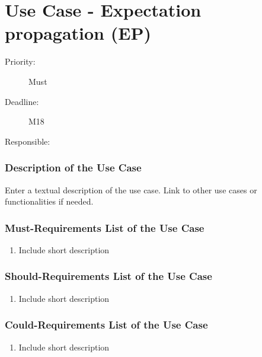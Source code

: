 \newpage
\section{Use Case - Expectation propagation (EP)}
\label{UseCase:EP}

\begin{description}
\item[Priority:] Must
\item[Deadline:] M18
\item[Responsible:]
\end{description}

\subsubsection*{Description of the Use Case}

Enter a textual description of the use case. Link to other use cases or functionalities if needed. 


\subsubsection*{Must-Requirements List of the Use Case}

\begin{enumerate}
\item Include short description
\end{enumerate}

\subsubsection*{Should-Requirements List of the Use Case}

\begin{enumerate}
\item Include short description
\end{enumerate}

\subsubsection*{Could-Requirements List of the Use Case}

\begin{enumerate}
\item Include short description
\end{enumerate}


